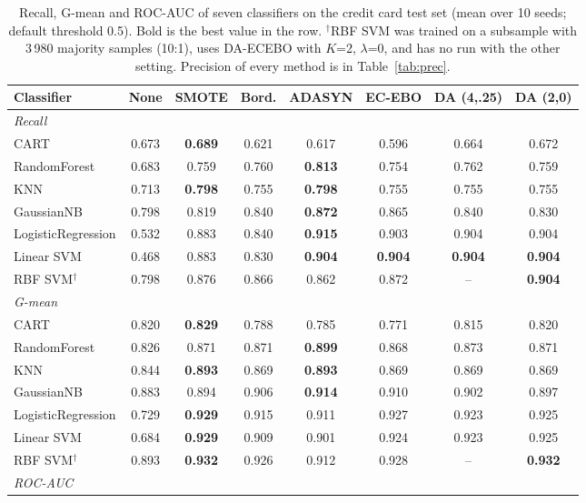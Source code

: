 \documentclass[preprint,10pt]{elsarticle}
\begin{document}
\begin{table}[!htbp]
\centering\small
\caption{Recall, G-mean and ROC-AUC of seven classifiers on the credit card test set (mean over 10 seeds; default threshold 0.5). Bold is the best value in the row. $^\dagger$RBF SVM was trained on a subsample with 3\,980 majority samples (10:1), uses DA-ECEBO with $K$=2, $\lambda$=0, and has no run with the other setting. Precision of every method is in Table~\ref{tab:prec}.}\label{tab:rgauc}
\setlength{\tabcolsep}{4pt}
\begin{tabular}{lccccccc}
\toprule
Classifier & None & SMOTE & Bord. & ADASYN & EC-EBO & DA (4,.25) & DA (2,0)\\
\midrule
\multicolumn{8}{l}{\textit{Recall}}\\
CART & 0.673 & \textbf{0.689} & 0.621 & 0.617 & 0.596 & 0.664 & 0.672\\
RandomForest & 0.683 & 0.759 & 0.760 & \textbf{0.813} & 0.754 & 0.762 & 0.759\\
KNN & 0.713 & \textbf{0.798} & 0.755 & \textbf{0.798} & 0.755 & 0.755 & 0.755\\
GaussianNB & 0.798 & 0.819 & 0.840 & \textbf{0.872} & 0.865 & 0.840 & 0.830\\
LogisticRegression & 0.532 & 0.883 & 0.840 & \textbf{0.915} & 0.903 & 0.904 & 0.904\\
Linear SVM & 0.468 & 0.883 & 0.830 & \textbf{0.904} & \textbf{0.904} & \textbf{0.904} & \textbf{0.904}\\
RBF SVM$^\dagger$ & 0.798 & 0.876 & 0.866 & 0.862 & 0.872 & -- & \textbf{0.904}\\
\midrule
\multicolumn{8}{l}{\textit{G-mean}}\\
CART & 0.820 & \textbf{0.829} & 0.788 & 0.785 & 0.771 & 0.815 & 0.820\\
RandomForest & 0.826 & 0.871 & 0.871 & \textbf{0.899} & 0.868 & 0.873 & 0.871\\
KNN & 0.844 & \textbf{0.893} & 0.869 & \textbf{0.893} & 0.869 & 0.869 & 0.869\\
GaussianNB & 0.883 & 0.894 & 0.906 & \textbf{0.914} & 0.910 & 0.902 & 0.897\\
LogisticRegression & 0.729 & \textbf{0.929} & 0.915 & 0.911 & 0.927 & 0.923 & 0.925\\
Linear SVM & 0.684 & \textbf{0.929} & 0.909 & 0.901 & 0.924 & 0.923 & 0.925\\
RBF SVM$^\dagger$ & 0.893 & \textbf{0.932} & 0.926 & 0.912 & 0.928 & -- & \textbf{0.932}\\
\midrule
\multicolumn{8}{l}{\textit{ROC-AUC}}\\

\end{tabular}
\end{table}
\end{document}
